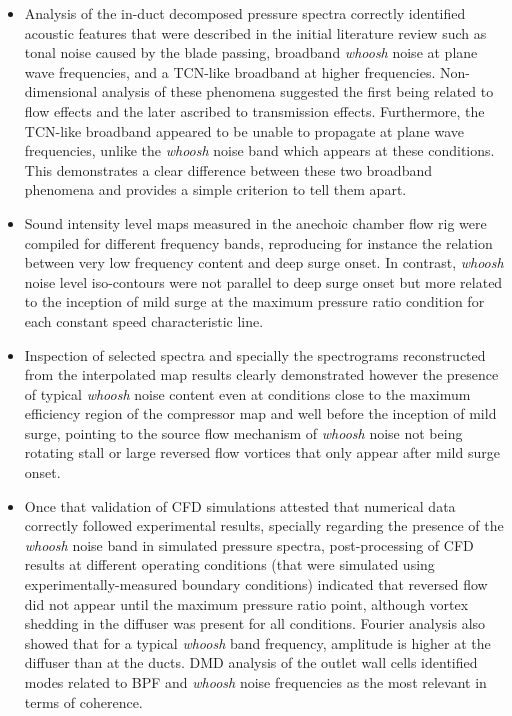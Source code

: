 \begin{itemize}
	\item Analysis of the in-duct decomposed pressure spectra correctly identified acoustic features that were described in the initial literature review such as tonal noise caused by the blade passing,  broadband \emph{whoosh} noise at plane wave frequencies, and a TCN-like broadband at higher frequencies. Non-dimensional analysis of these phenomena suggested the first being related to flow effects and the later ascribed to transmission effects. Furthermore, the TCN-like broadband appeared to be unable to propagate at plane wave frequencies, unlike the \emph{whoosh} noise band which appears at these conditions. This demonstrates a clear difference between these two broadband phenomena and provides a simple criterion to tell them apart.

	\item Sound intensity level maps measured in the anechoic chamber flow rig were compiled for different frequency bands, reproducing for instance the relation between very low frequency content and deep surge onset. In contrast, \emph{whoosh} noise level iso-contours were not parallel to deep surge onset but more related to the inception of mild surge at the maximum pressure ratio condition for each constant speed characteristic line.

	\item Inspection of selected spectra and specially the spectrograms reconstructed from the interpolated map results clearly demonstrated however the presence of typical \emph{whoosh} noise content even at conditions close to the maximum efficiency region of the compressor map and well before the inception of mild surge, pointing to the source flow mechanism of \emph{whoosh} noise not being rotating stall or large reversed flow vortices  that only appear after mild surge onset.

	\item Once that validation of CFD simulations attested that numerical data correctly followed experimental results, specially regarding the presence of the \emph{whoosh} noise band in simulated pressure spectra, post-processing of CFD results at different operating conditions (that were simulated using experimentally-measured boundary conditions) indicated that reversed flow did not appear until the maximum pressure ratio point, although vortex shedding in the diffuser was present for all conditions. Fourier analysis also showed that for a typical \emph{whoosh} band frequency, amplitude is higher at the diffuser than at the ducts. DMD analysis of the outlet wall cells identified modes related to BPF and \emph{whoosh} noise frequencies as the most relevant in terms of coherence.


\end{itemize}
